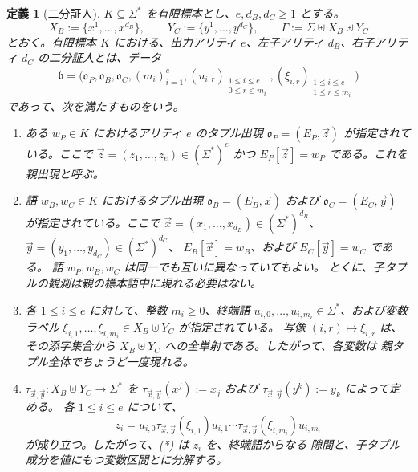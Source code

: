 \documentclass[11pt,a4paper]{ltjsarticle}
\newtheorem{definition}[theorem]{定義}
\theoremstyle{remark}
\newcommand{\tuple}[1]{\vec{#1}}
\begin{document}
\begin{definition}[二分証人]
\label{def:binary-witness}
\(K\subseteq\Sigma^*\) を有限標本とし、\(e,d_B,d_C\ge1\) とする。
\[
  X_B:=\{x^1,\ldots,x^{d_B}\},\qquad
  Y_C:=\{y^1,\ldots,y^{d_C}\},\qquad
  \Gamma:=\Sigma\uplus X_B\uplus Y_C
\]
とおく。有限標本 \(K\) における、出力アリティ \(e\)、左子アリティ
\(d_B\)、右子アリティ \(d_C\) の\emph{二分証人}とは、データ
\[
  \mathfrak b=\bigl(
    \mathfrak o_P,\mathfrak o_B,\mathfrak o_C,(m_i)_{i=1}^e,
    (u_{i,r})_{\substack{1\le i\le e\\0\le r\le m_i}},
    (\xi_{i,r})_{\substack{1\le i\le e\\1\le r\le m_i}}
  \bigr)
\]
であって、次を満たすものをいう。
\begin{enumerate}[label=(\roman*),leftmargin=*]
\item ある \(w_P\in K\) におけるアリティ \(e\) のタプル出現
      \(\mathfrak o_P=(E_P,\tuple z)\) が指定されている。ここで
      \(\tuple z=(z_1,\ldots,z_e)\in(\Sigma^*)^e\) かつ
      \(E_P[\tuple z]=w_P\) である。これを\emph{親出現}と呼ぶ。

\item 語 \(w_B,w_C\in K\) におけるタプル出現
      \(\mathfrak o_B=(E_B,\tuple x)\) および
      \(\mathfrak o_C=(E_C,\tuple y)\) が指定されている。ここで
      \(\tuple x=(x_1,\ldots,x_{d_B})\in(\Sigma^*)^{d_B}\)、
      \(\tuple y=(y_1,\ldots,y_{d_C})\in(\Sigma^*)^{d_C}\)、
      \(E_B[\tuple x]=w_B\)、および \(E_C[\tuple y]=w_C\) である。
      語 \(w_P,w_B,w_C\) は同一でも互いに異なっていてもよい。
      とくに、子タプルの観測は親の標本語中に現れる必要はない。

\item 各 \(1\le i\le e\) に対して、整数 \(m_i\ge0\)、終端語
      \(u_{i,0},\ldots,u_{i,m_i}\in\Sigma^*\)、および変数ラベル
      \(\xi_{i,1},\ldots,\xi_{i,m_i}\in X_B\uplus Y_C\) が指定されている。
      写像 \((i,r)\mapsto\xi_{i,r}\) は、その添字集合から
      \(X_B\uplus Y_C\) への全単射である。したがって、各変数は
      親タプル全体でちょうど一度現れる。

\item \(\tau_{\tuple x,\tuple y}:X_B\uplus Y_C\to\Sigma^*\) を
      \(\tau_{\tuple x,\tuple y}(x^j):=x_j\) および
      \(\tau_{\tuple x,\tuple y}(y^k):=y_k\) によって定める。
      各 \(1\le i\le e\) について、
      \[
        z_i=u_{i,0}\tau_{\tuple x,\tuple y}(\xi_{i,1})u_{i,1}\cdots
        \tau_{\tuple x,\tuple y}(\xi_{i,m_i})u_{i,m_i}
        \tag{*}
      \]
      が成り立つ。したがって、\textup{(*)} は \(z_i\) を、終端語からなる
      隙間と、子タプル成分を値にもつ変数区間とに分解する。


\end{enumerate}
\end{definition}
\end{document}
